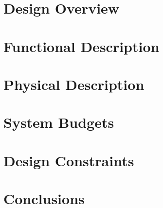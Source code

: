 \documentclass[a4paper,11pt,oneside]{article}
\begin{document}
\newpage

\section{Design Overview}


\newpage

\section{Functional Description}


\newpage

\section{Physical Description}


\newpage

\section{System Budgets}


\newpage

\section{Design Constraints}



\section{Conclusions}

\end{document}
